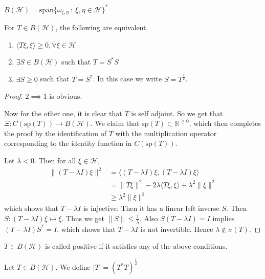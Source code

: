 \begin{theorem}
  $B(\mathcal{H}) = \overline{\textrm{span}}\{ \omega_{\xi, \eta}
  \ : \    \xi, \eta \in \mathcal{H} \}^*$
\end{theorem}

\begin{proposition}
  For $T \in B(\mathcal{H})$, the following are equivalent.
  \begin{enumerate}[label=(\arabic*)]
    \item $\langle T \xi ,  \xi \rangle \ge 0, \forall \xi
      \in \mathcal{H}$
    \item $\exists S \in B(\mathcal{H})$ such that  $T = S^*S$
    \item $\exists S \ge 0$ such that $T = S^2$. In this case we
      write $S = T^{\frac{1}{2}}$.
  \end{enumerate}
\end{proposition}
\begin{proof}
  $2 \implies 1$ is obvious.

  Now for the other one, it is clear that $T$ is self adjoint. So we
  get that $\Xi: C(\textrm{sp}(T)) \to B(\mathcal{H})$. We claim that
  $\textrm{sp}(T) \subset \mathbb{R}^{\ge 0}$, which then completes
  the proof by the identification of $T$ with the multiplication
  operator corresponding to the identity function in $C(\textrm{sp}(T))$.

  Let $\lambda < 0$. Then for all $\xi \in \mathcal{H}$,
  \begin{align*}
    \|(T - \lambda I) \xi\|^2 &= \langle (T - \lambda I) \xi , (T -
    \lambda I) \xi \rangle \\
    &= \|T \xi\|^2 - 2 \lambda \langle T \xi ,
    \xi \rangle + \lambda^2 \|\xi\|^2 \\
    & \ge \lambda^2 \|\xi\|^2
  \end{align*}
  which shows that $T - \lambda I$ is injective. Then it has a linear
  left inverse $S$. Then $S : (T - \lambda I) \xi \mapsto  \xi$. Thus
  we get $\|S\| \le \frac{1}{\lambda}$. Also $S(T- \lambda I) = I$
  implies $(T - \lambda I) S^* = I$, which shows that $T - \lambda I$
  is not invertible. Hence $\lambda \not\in \sigma(T)$.
\end{proof}

\begin{definition}
  $T \in B(\mathcal{H})$ is called positive if it satisfies any of
  the above conditions.
\end{definition}

\begin{definition}
  Let $T \in B(\mathcal{H})$. We define $|T| = (T^*T)^{ \frac{1}{2}}$
\end{definition}

